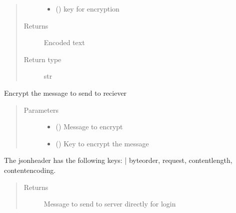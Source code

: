 \documentclass[letterpaper,10pt,english]{sphinxmanual}
\begin{document}
\begin{fulllineitems}
\begin{fulllineitems}
\begin{quote}
\begin{description}
\begin{itemize}
\item {} 
 () \textendash{} key for encryption

\end{itemize}

\item[{Returns}] \leavevmode
Encoded text

\item[{Return type}] \leavevmode
str

\end{description}\end{quote}

\end{fulllineitems}


\begin{fulllineitems}
\label{\detokenize{Message:Message.Message._encrypt}}
Encrypt the message to send to reciever
\begin{quote}\begin{description}
\item[{Parameters}] \leavevmode\begin{itemize}
\item {} 
 () \textendash{} Message to encrypt

\item {} 
 () \textendash{} Key to encrypt the message

\end{itemize}

\end{description}\end{quote}

\end{fulllineitems}


\begin{fulllineitems}
\label{\detokenize{Message:Message.Message._create_loginpass_request}}
The jsonheader has the following keys: |
byteorder, request, content\sphinxhyphen{}length, content\sphinxhyphen{}encoding.
\begin{quote}\begin{description}
\item[{Returns}] \leavevmode
Message to send to server directly for login


\end{description}
\end{quote}
\end{fulllineitems}
\end{fulllineitems}
\end{document}
